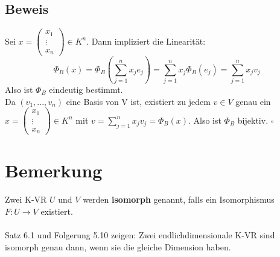 \documentclass{scrbook}
\begin{document}
\subsection*{Beweis}
Sei $x=\left(\begin{array}{c}
x_1\\\vdots\\x_n
\end{array}\right) \in K^n$. Dann impliziert die Linearität:\[\Phi_B(x) = \Phi_B(\sum^n_{j=1}x_je_j)=\sum^n_{j=1}x_j \Phi_B(e_j) = \sum^n_{j=1} x_j v_j\] Also ist $\Phi_B$ eindeutig bestimmt.\\
Da $(v_1,...,v_n)$ eine Basis von V ist, existiert zu jedem $v\in V$ genau ein $x =\left( \begin{array}{c}
x_1\\\vdots\\x_n
\end{array}\right) \in K^n$ mit $v = \sum^n_{j=1}x_jv_j = \Phi_B(x)$. Also ist $\Phi_B$ bijektiv. $\square$
\section{Bemerkung}
Zwei K-VR $U$ und $V$ werden \textbf{isomorph} genannt, falls ein Isomorphismus $F:U\rightarrow V$ existiert.\\\\
Satz 6.1 und Folgerung 5.10 zeigen: Zwei endlichdimensionale K-VR sind isomorph genau dann, wenn sie die gleiche Dimension haben.
\end{document}
